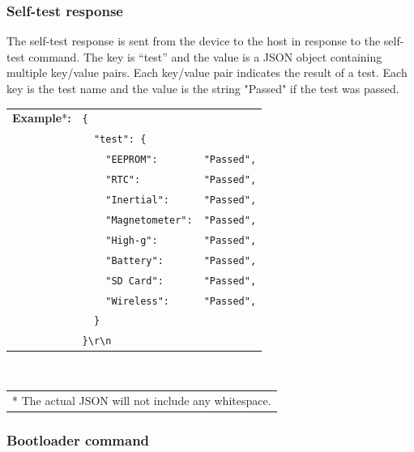 
\subsubsection{Self-test response}

The self-test response is sent from the device to the host in response to the self-test command.  The key is \enquote{test} and the value is a \ac{JSON} object containing multiple key/value pairs.  Each key/value pair indicates the result of a test.  Each key is the test name and the value is the string "Passed" if the test was passed.

\begin{table}[H]
    \begin{tabular}{l l l}
        \textbf{Example}*\textbf{:} & \texttt{\{}\\
        & \texttt{~~"test":~\{} &\\
        & \texttt{~~~~"EEPROM":} & \texttt{"Passed",}\\
        & \texttt{~~~~"RTC":} & \texttt{"Passed",}\\
        & \texttt{~~~~"Inertial":} & \texttt{"Passed",}\\
        & \texttt{~~~~"Magnetometer":} & \texttt{"Passed",}\\
        & \texttt{~~~~"High-g":} & \texttt{"Passed",}\\
        & \texttt{~~~~"Battery":} & \texttt{"Passed",}\\
        & \texttt{~~~~"SD Card":} & \texttt{"Passed",}\\
        & \texttt{~~~~"Wireless":} & \texttt{"Passed",}\\
        & \texttt{~~\}}\\
        & \texttt{\}\textbackslash r\textbackslash n}\\
    \end{tabular}\\
    \begin{tabular}{l}
        \\
        \footnotesize{* The actual \acs{JSON} will not include any whitespace.}
    \end{tabular}
\end{table}

\subsubsection{Bootloader command}

